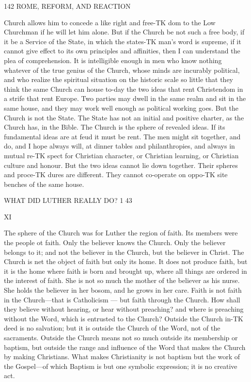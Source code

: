 \documentclass[12pt,a5paper,twoside]{book}
\begin{document}
{142 ROME, REFORM, AND REACTION 

Church allows him to concede a like right and free-TK
dom to the Low Churchman if he will let him alone. 
But if the Church be not such a free body, if it 
be a Service of the State, in which the states-TK
man's word is supreme, if it cannot give effect to its 
own principles and affinities, then I can understand 
the plea of comprehension. It is intelligible enough 
in men who know nothing whatever of the true 
genius of the Church, whose minds are incurably 
political, and who realize the spiritual situation on 
the historic scale so little that they think the same 
Church can house to-day the two ideas that rent 
Christendom in a strife that rent Europe. Two 
parties may dwell in the same realm and sit in the 
same house, and they may work well enough as 
political working goes. But the Church is not the 
State. The State has not an initial and positive 
charter, as the Church has, in the Bible. The Church 
is the sphere of revealed ideas. If its fundamental 
ideas are at feud it must be rent. The men might 
sit together, and do, and I hope always will, at dinner 
tables and philanthropies, and always in mutual re-TK
spect for Christian character, or Christian learning, 
or Christian culture and honour. But the two ideas 
cannot lie down together. Their spheres and proce-TK
dures are different. They cannot co-operate on oppo-TK
site benches of the same house. 



WHAT DID LUTHER REALLY DO? 1 43 

XI 

The sphere of the Church was for Luther the 
region of faith. Its members were the people ot 
faith. Only the believer knows the Church. Only 
the believer belongs to it; and not the believer in 
the Church, but the believer in Christ. The Church 
is net the object of faith but only its home. It 
does not produce faith, but it is the home where 
faith is born and brought up, where all things are 
ordered in the interest of faith. She is not so much 
the mother of the believer as his nurse. She holds 
the believer in her bosom, and he grows in her care. 
Faith is not faith in the Church---that is Catholicism 
— but faith through the Church. How shall they 
believe without hearing, or hear without preaching? 
and where is preaching without the Word, which is 
entrusted to the Church? Outside the Church in-TK
deed is no salvation; but it is outside the Church 
of the Word, not of the sacraments. Outside the 
Church means not so much outside its membership 
or baptism, but outside the range and influence of the 
Word that makes the Church by making Christians. 
What makes Christianity is not baptism but the work 
of the Gospel---of which Baptism is but one symbolic 
expression; it is no creative act. 

}
\end{document}

